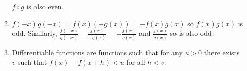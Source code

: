 \documentclass[10pt]{article}
\begin{document}
\begin{enumerate}
\begin{enumerate}
                    $f \circ g$ is also even.
                \item $f(-x)g(-x) = f(x)(-g(x)) = -f(x)g(x)$ so $f(x)g(x)$ is
                    odd. Similarly, $\frac{f(-x)}{g(-x)} = \frac{f(x)}{-g(x)} =
                    -\frac{f(x)}{g(x)}$ and $\frac{f(x)}{g(x)}$ so is also odd.
                \item Differentiable functions are functions such that for any
                    $u > 0$ there exists $v$ such that $f(x) - f(x + h) < u$
                    for all $h < v$.
            \end{enumerate}
    \end{enumerate}
\end{document}

